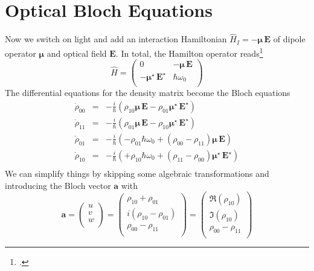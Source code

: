 \section{Optical Bloch Equations}

Now we switch on light and add an interaction Hamiltonian $\hat{H}_I = -\boldsymbol{\mu} \, \boldsymbol{E}$ of dipole operator $\boldsymbol{\mu} $ and optical field   $\boldsymbol{E}$. In total, the Hamilton operator reads\footcite[chap. 3.8]{Rand2016}
\[
 \hat{H } = \begin{pmatrix}
  0 & - {\boldsymbol{\mu}} \, \boldsymbol{E} \\ - {\boldsymbol{\mu}}^\star \, \boldsymbol{E}^\star & \hbar \omega_0 \\
 \end{pmatrix}
\]
The differential equations for the density matrix become the Bloch equations
\begin{eqnarray*}
\dot{\rho}_{00} &=&  - \frac{i}{\hbar} \left( \rho_{10} \boldsymbol{\mu} \, \boldsymbol{E} - \rho_{01} \boldsymbol{\mu}^\star \, \boldsymbol{E}^\star \right) \\
%
\dot{\rho}_{11} &=&  - \frac{i}{\hbar} \left( \rho_{01} \boldsymbol{\mu} \, \boldsymbol{E} - \rho_{10} \boldsymbol{\mu}^\star \, \boldsymbol{E}^\star \right) \\
%
\dot{\rho}_{01} &=& - \frac{i}{\hbar}  \left( - \rho_{01} \hbar \omega_0 + (\rho_{00} - \rho_{11})  \boldsymbol{\mu} \, \boldsymbol{E} \right) \\
%
\dot{\rho}_{10} &=& - \frac{i}{\hbar}  \left( + \rho_{10} \hbar \omega_0 + (\rho_{11} - \rho_{00})  \boldsymbol{\mu}^\star \, \boldsymbol{E}^\star \right) \\
\end{eqnarray*}
We can simplify things by skipping some algebraic transformations and introducing the Bloch vector $\boldsymbol{a}$ with
\[
\boldsymbol{a} = 
\begin{pmatrix}
u \\ v \\ w \\
\end{pmatrix}
= 
\begin{pmatrix}
\rho_{10} + \rho_{01} \\ i (\rho_{10} - \rho_{01}) \\ \rho_{00} - \rho_{11} \\
\end{pmatrix}
= 
\begin{pmatrix}
\Re (\rho_{10})  \\ \Im (\rho_{10}) \\ \rho_{00} - \rho_{11} \\
\end{pmatrix}
\]
